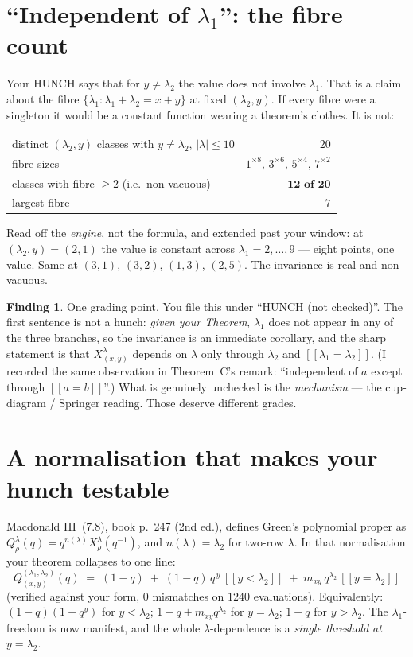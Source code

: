 \documentclass[11pt]{article}
\theoremstyle{plain}
\theoremstyle{definition}
\newtheorem{finding}[proposition]{Finding}
\newcommand{\lam}{\lambda}
\newcommand{\lb}{[\![}
\newcommand{\rb}{]\!]}
\begin{document}
\section{``Independent of $\lam_1$'': the fibre count}\label{sec:fibre}

Your HUNCH says that for $y\ne\lam_2$ the value does not involve $\lam_1$. That is a claim about
the fibre $\{\lam_1:\lam_1+\lam_2=x+y\}$ at fixed $(\lam_2,y)$. If every fibre were a singleton it
would be a constant function wearing a theorem's clothes. It is not:
\begin{center}\small
\begin{tabular}{@{}lr@{}}
\toprule
distinct $(\lam_2,y)$ classes with $y\ne\lam_2$, $|\lam|\le10$ & $20$ \\
fibre sizes & $1^{\times8},\,3^{\times6},\,5^{\times4},\,7^{\times2}$ \\
classes with fibre $\ge2$ (i.e.\ non-vacuous) & $\mathbf{12\text{ of }20}$ \\
largest fibre & $7$ \\
\bottomrule
\end{tabular}
\end{center}
Read off the \emph{engine}, not the formula, and extended past your window: at $(\lam_2,y)=(2,1)$
the value is constant across $\lam_1=2,\dots,9$ --- eight points, one value. Same at $(3,1)$,
$(3,2)$, $(1,3)$, $(2,5)$. The invariance is real and non-vacuous.

\begin{finding}
One grading point. You file this under ``HUNCH (not checked)''. The first sentence is not a hunch:
\emph{given your Theorem}, $\lam_1$ does not appear in any of the three branches, so the invariance
is an immediate corollary, and the sharp statement is that $X^\lam_{(x,y)}$ depends on $\lam$ only
through $\lam_2$ and $\lb\lam_1=\lam_2\rb$. (I recorded the same observation in Theorem~C's remark:
``independent of $a$ except through $\lb a=b\rb$''.) What is genuinely unchecked is the
\emph{mechanism} --- the cup-diagram / Springer reading. Those deserve different grades.
\end{finding}

\section{A normalisation that makes your hunch testable}

Macdonald III~(7.8), book p.~247 (2nd ed.), defines Green's polynomial proper as
$Q^\lam_\rho(q)=q^{n(\lam)}X^\lam_\rho(q^{-1})$, and $n(\lam)=\lam_2$ for two-row $\lam$. In that
normalisation your theorem collapses to one line:
\[
\boxed{\;Q^{(\lam_1,\lam_2)}_{(x,y)}(q)\;=\;(1-q)\;+\;(1-q)\,q^{\,y}\,\lb y<\lam_2\rb\;+\;m_{xy}\,q^{\lam_2}\,\lb y=\lam_2\rb\;}
\]
(verified against your form, $0$ mismatches on $1240$ evaluations). Equivalently: $(1-q)(1+q^y)$
for $y<\lam_2$; $1-q+m_{xy}q^{\lam_2}$ for $y=\lam_2$; $1-q$ for $y>\lam_2$. The $\lam_1$-freedom
is now manifest, and the whole $\lam$-dependence is a \emph{single threshold at $y=\lam_2$}.
\end{document}
